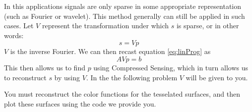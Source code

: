 In this applications signals are only sparse in some appropriate representation (such as Fourier or wavelet). This method generally can still be applied in such cases. Let $V$ represent the transformation under which $s$ is sparse, or in other words:
\begin{equation}
s = V p
\end{equation}
$V$ is the inverse Fourier. We can then recast equation \ref{eq:linProg} as
\begin{equation}
A V p = b
\end{equation}
This then allows us to find $p$ using Compressed Sensing, which in turn allows us to reconstruct $s$ by using $V$. In the the following problem $V$ will be given to you.

You must reconstruct the color functions
for the tesselated surfaces, and then plot these surfaces using the code we provide you.

%
%

